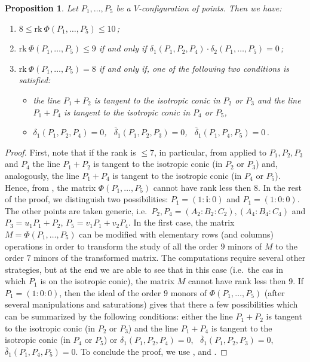 \documentclass[12pt, a4paper, reqno, captions=tableheading,bibliography=totoc]{scrartcl}
\theoremstyle{plain}
\newtheorem{prop}[lemma]{Proposition}
\theoremstyle{definition}
\newcommand{\iii}{\textbf{i}}
\begin{document}
\begin{prop}
\label{pr5}
Let $P_1, \dots, P_5$ be a $V$-configuration of
points. Then we have:
\begin{enumerate}
\item $8 \leq \text{rk}\ \Phi(P_1, \dots, P_5) \leq 10$\,;
\item $\text{rk}\ \Phi(P_1, \dots, P_5) \leq 9$ if and only if
$\delta_1(P_1, P_2, P_4) \cdot \delta_2(P_1, \dots, P_5) =0$\,;
\item $\text{rk}\ \Phi(P_1, \dots, P_5) = 8$ if and only if, one of
the following two conditions is satisfied:
\begin{itemize}
  \item the line $P_1+P_2$ is tangent to the isotropic conic in $P_2$ or $P_3$
and the line $P_1+P_4$ is tangent to the isotropic conic in $P_4$ or $P_5$,
\item $\delta_1(P_1, P_2, P_4) = 0$, \
$\overline{\delta}_1(P_1, P_2, P_3) = 0$,
\ $\overline{\delta}_1(P_1, P_4, P_5) = 0$\,.
\end{itemize}
\end{enumerate}
\end{prop}
\begin{proof}
First, note that if the rank is $\leq 7$, in particular, from
 applied to $P_1, P_2, P_3$ and $P_4$
the line $P_1+P_2$ is tangent to the isotropic conic (in $P_2$ or $P_3$)
and, analogously, the line $P_1+P_4$ is tangent to the isotropic conic
(in $P_4$ or $P_5$). Hence, from \Cref{prop:frecciaFissata},
the matrix $\Phi(P_1, \dots, P_5)$ cannot have rank less then $8$.
In the rest of the proof, we distinguish two possibilities:
$P_1 = (1:\iii :0)$ and
$P_1 = (1: 0: 0)$. The other points are taken generic,
i.e.\ $P_2, P_4 = (A_2: B_2: C_2), (A_4: B_4: C_4)$ and
$P_3 = u_1P_1+P_2$, $P_5 = v_1P_1+v_2P_4$.
In the first case, the matrix
$M = \Phi(P_1, \dots, P_5)$ can be modified with elementary rows (and
columns) operations in order to transform the study of all the
order $9$ minors of $M$ to the order $7$ minors of the transformed matrix.
The computations require several other strategies, but at the end we are
able to see that in this case (i.e.\ the cas in which $P_1$ is on the
isotropic conic), the matrix $M$ cannot have rank less then $9$.
If $P_1 = (1: 0: 0)$, then the ideal of the order $9$ monors of
$\Phi(P_1, \dots, P_5)$ (after several manipulations and saturations)
gives that there a few possibilities which can be summarized by the
following conditions: either the line $P_1+P_2$ is tangent to the isotropic
conic (in $P_2$ or $P_3$) and the line $P_1+P_4$ is tangent to the isotropic
conic (in $P_4$ or $P_5$) or $\delta_1(P_1, P_2, P_4) = 0$,
\ $\overline{\delta}_1(P_1, P_2, P_3) = 0$,
\ $\overline{\delta}_1(P_1, P_4, P_5) = 0$.
To conclude the proof, we use , 
and \Cref{prop:d1d2}.
\end{proof}
\end{document}
